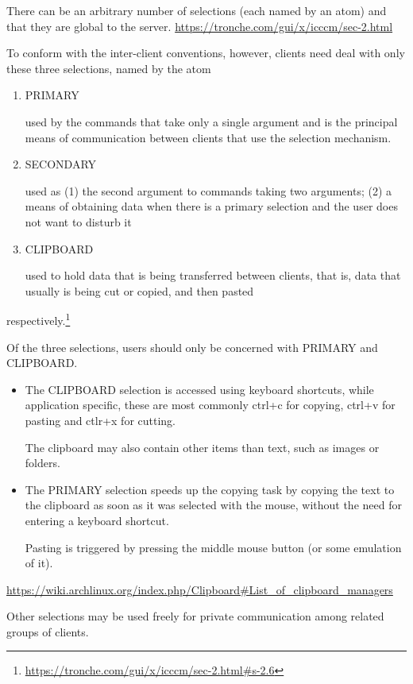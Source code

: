 There can be an arbitrary number of selections (each named by an atom) and that
they are global to the server. 
\url{https://tronche.com/gui/x/icccm/sec-2.html}

To conform with the inter-client conventions, however, clients need deal with
only these three selections, named by the atom  
\begin{enumerate}
  \item PRIMARY
  
  used by the commands that take only a single argument and is the principal
  means of communication between clients that use the selection mechanism. 
  
  \item SECONDARY
  
  used as (1) the second argument to commands taking two arguments; 
  (2)  a means of obtaining data when there is a primary selection and the user
  does not want to disturb it 
  \item CLIPBOARD
  
  used to hold data that is being transferred between clients, that is, data
  that usually is being cut or copied, and then pasted
\end{enumerate}
respectively.\footnote{\url{https://tronche.com/gui/x/icccm/sec-2.html\#s-2.6}}

Of the three selections, users should only be concerned with PRIMARY and
CLIPBOARD.   
\begin{itemize}
  
  \item The CLIPBOARD selection is accessed using keyboard shortcuts, while
application specific, these are most commonly ctrl+c for copying, ctrl+v for
pasting and ctlr+x for cutting.

The clipboard may also contain other items than text, such as images or folders.

  \item  The PRIMARY selection speeds up the copying task by copying the text to
  the clipboard as soon as it was selected with the mouse, without the need for
  entering a keyboard shortcut.  
  
   Pasting is triggered by pressing the middle mouse button (or some emulation
   of it). 
\end{itemize}
\url{https://wiki.archlinux.org/index.php/Clipboard\#List_of_clipboard_managers}

Other selections may be used freely for private communication among related
groups of clients. 

